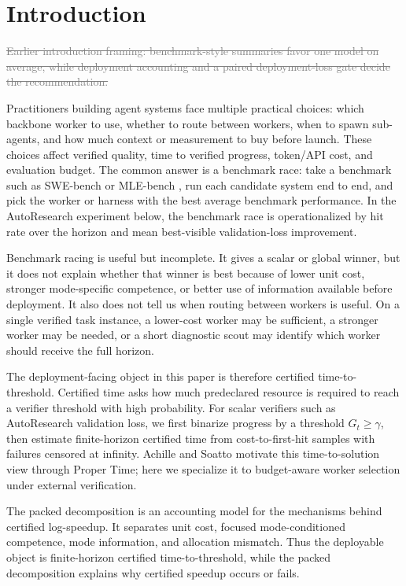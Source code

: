 \documentclass{article}
\newcommand{\oldtext}[1]{\textcolor{gray}{\sout{#1}}}
\begin{document}
\section{Introduction}
\label{sec:intro}

\oldtext{Earlier introduction framing: benchmark-style summaries favor one model on average, while deployment accounting and a paired deployment-loss gate decide the recommendation.}
{\color{green!50!black}
Practitioners building agent systems face multiple practical choices: which backbone worker to use, whether to route between workers, when to spawn sub-agents, and how much context or measurement to buy before launch.
These choices affect verified quality, time to verified progress, token/API cost, and evaluation budget.
The common answer is a benchmark race: take a benchmark such as SWE-bench \citep{jimenez2024swebench} or MLE-bench \citep{chan2024mlebench}, run each candidate system end to end, and pick the worker or harness with the best average benchmark performance.
In the AutoResearch experiment below, the benchmark race is operationalized by hit rate over the horizon and mean best-visible validation-loss improvement.

Benchmark racing is useful but incomplete.
It gives a scalar or global winner, but it does not explain whether that winner is best because of lower unit cost, stronger mode-specific competence, or better use of information available before deployment.
It also does not tell us when routing between workers is useful.
On a single verified task instance, a lower-cost worker may be sufficient, a stronger worker may be needed, or a short diagnostic scout may identify which worker should receive the full horizon.

The deployment-facing object in this paper is therefore certified time-to-threshold.
Certified time asks how much predeclared resource is required to reach a verifier threshold with high probability.
For scalar verifiers such as AutoResearch validation loss, we first binarize progress by a threshold \(G_t\ge\gamma\), then estimate finite-horizon certified time from cost-to-first-hit samples with failures censored at infinity.
Achille and Soatto \citep{achille2025agents} motivate this time-to-solution view through Proper Time; here we specialize it to budget-aware worker selection under external verification.

The packed decomposition is an accounting model for the mechanisms behind certified log-speedup.
It separates unit cost, focused mode-conditioned competence, mode information, and allocation mismatch.
Thus the deployable object is finite-horizon certified time-to-threshold, while the packed decomposition explains why certified speedup occurs or fails.

}
\end{document}
